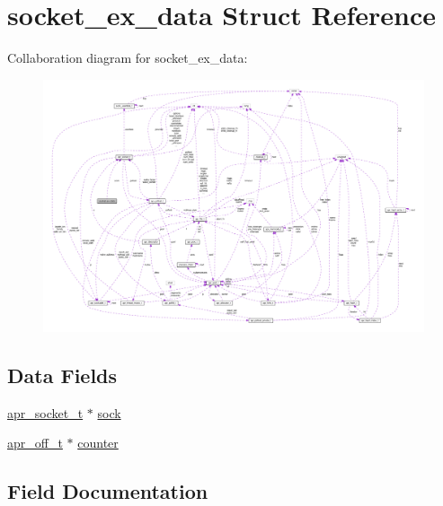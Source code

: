 \hypertarget{structsocket__ex__data}{}\section{socket\+\_\+ex\+\_\+data Struct Reference}
\label{structsocket__ex__data}


Collaboration diagram for socket\+\_\+ex\+\_\+data\+:
\nopagebreak
\begin{figure}[H]
\begin{center}
\leavevmode
\includegraphics[width=350pt]{structsocket__ex__data__coll__graph}
\end{center}
\end{figure}
\subsection*{Data Fields}
\begin{DoxyCompactItemize}
\item 
\hyperlink{structapr__socket__t}{apr\+\_\+socket\+\_\+t} $\ast$ \hyperlink{structsocket__ex__data_aaba3d50d6fab1225a5c3fc6567ffe145}{sock}
\item 
\hyperlink{group__apr__platform_ga6938af9075cec15c88299109381aa984}{apr\+\_\+off\+\_\+t} $\ast$ \hyperlink{structsocket__ex__data_a3168a40f51622d10f845e5c9228a7407}{counter}
\end{DoxyCompactItemize}


\subsection{Field Documentation}
